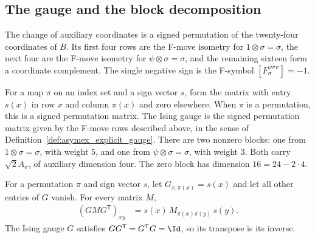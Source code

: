 \subsection{The gauge and the block decomposition}%
\label{sec:asymex_ising_gauge}

The change of auxiliary coordinates is a signed permutation of the
twenty-four coordinates of $B$. Its first four rows are the F-move
isometry for $1\otimes\sigma=\sigma$, the next four are the F-move
isometry for $\psi\otimes\sigma=\sigma$, and the remaining sixteen
form a coordinate complement. The single negative sign is the F-symbol
$[F^{\psi\sigma\psi}_\sigma]=-1$.

\begin{definition}%
    \label{def:asymex_ising_gauge}
    \leanok
    For a map $\pi$ on an index set and a sign vector $s$, form the
    matrix with entry $s(x)$ in row $x$ and column $\pi(x)$ and zero
    elsewhere. When $\pi$ is a permutation, this is a signed permutation
    matrix. The Ising gauge is the signed permutation matrix given by the
    F-move rows described above, in the sense of
    Definition~\ref{def:asymex_explicit_gauge}.
    There are two nonzero blocks: one from $1\otimes\sigma=\sigma$,
    with weight $5$, and one from $\psi\otimes\sigma=\sigma$, with
    weight $3$. Both carry $\sqrt2A_\sigma$, of auxiliary dimension
    four. The zero block has dimension $16=24-2\cdot4$.
\end{definition}

\begin{lemma}%
    \label{thm:asymex_ising_gauge_unitary}
    \leanok
    For a permutation $\pi$ and sign vector $s$, let
    $G_{x,\pi(x)}=s(x)$ and let all other entries of $G$ vanish.
    For every matrix $M$,
    \begin{align}
        (GMG^{\mathsf T})_{xy} & =s(x)\,M_{\pi(x)\pi(y)}\,s(y).
        \label{eq:asymex_ising_gauge_conj}
    \end{align}
    The Ising gauge $G$ satisfies $GG^{\mathsf T}=G^{\mathsf T}G=\Id$,
    so its transpose is its inverse.
\end{lemma}

